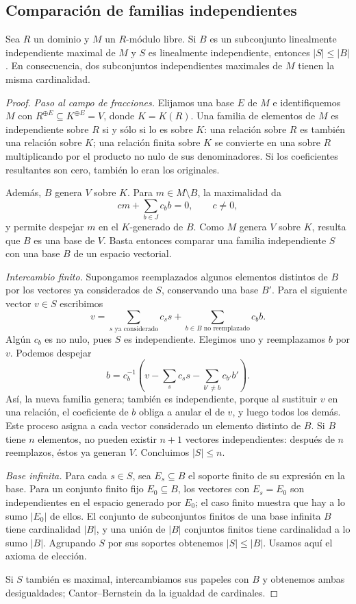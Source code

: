 \subsection{Comparación de familias independientes}\label{tema:20-2-1}
\begin{prop}\label{prop:C20-cardinal}
Sea $R$ un dominio y $M$ un $R$-módulo libre. Si $B$ es un subconjunto linealmente independiente maximal de $M$ y $S$ es linealmente independiente, entonces $|S|\leq|B|$. En consecuencia, dos subconjuntos independientes maximales de $M$ tienen la misma cardinalidad.
\end{prop}
\begin{proof}
\emph{Paso al campo de fracciones.} Elijamos una base $E$ de $M$ e identifiquemos $M$ con $R^{\oplus E}\subseteq K^{\oplus E}=V$, donde $K=K(R)$. Una familia de elementos de $M$ es independiente sobre $R$ si y sólo si lo es sobre $K$: una relación sobre $R$ es también una relación sobre $K$; una relación finita sobre $K$ se convierte en una sobre $R$ multiplicando por el producto no nulo de sus denominadores. Si los coeficientes resultantes son cero, también lo eran los originales.

Además, $B$ genera $V$ sobre $K$. Para $m\in M\setminus B$, la maximalidad da
\[
cm+\sum_{b\in J}c_bb=0,\qquad c\ne0,
\]
y permite despejar $m$ en el $K$-generado de $B$. Como $M$ genera $V$ sobre $K$, resulta que $B$ es una base de $V$. Basta entonces comparar una familia independiente $S$ con una base $B$ de un espacio vectorial.

\emph{Intercambio finito.} Supongamos reemplazados algunos elementos distintos de $B$ por los vectores ya considerados de $S$, conservando una base $B'$. Para el siguiente vector $v\in S$ escribimos
\[
v=\sum_{s\text{ ya considerado}}c_ss
  +\sum_{b\in B\text{ no reemplazado}}c_bb.
\]
Algún $c_b$ es no nulo, pues $S$ es independiente. Elegimos uno y reemplazamos $b$ por $v$. Podemos despejar
\[
b=c_b^{-1}\left(v-\sum_s c_ss-\sum_{b'\ne b}c_{b'}b'\right).
\]
Así, la nueva familia genera; también es independiente, porque al sustituir $v$ en una relación, el coeficiente de $b$ obliga a anular el de $v$, y luego todos los demás. Este proceso asigna a cada vector considerado un elemento distinto de $B$. Si $B$ tiene $n$ elementos, no pueden existir $n+1$ vectores independientes: después de $n$ reemplazos, éstos ya generan $V$. Concluimos $|S|\leq n$.

\emph{Base infinita.} Para cada $s\in S$, sea $E_s\subseteq B$ el soporte finito de su expresión en la base. Para un conjunto finito fijo $E_0\subseteq B$, los vectores con $E_s=E_0$ son independientes en el espacio generado por $E_0$; el caso finito muestra que hay a lo sumo $|E_0|$ de ellos. El conjunto de subconjuntos finitos de una base infinita $B$ tiene cardinalidad $|B|$, y una unión de $|B|$ conjuntos finitos tiene cardinalidad a lo sumo $|B|$. Agrupando $S$ por sus soportes obtenemos $|S|\leq|B|$. Usamos aquí el axioma de elección.

Si $S$ también es maximal, intercambiamos sus papeles con $B$ y obtenemos ambas desigualdades; Cantor--Bernstein da la igualdad de cardinales.
\end{proof}

